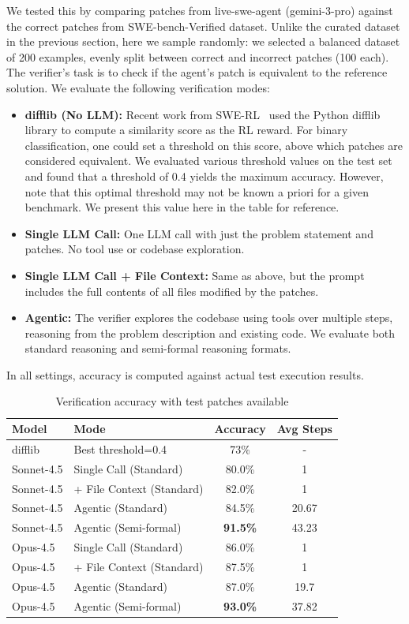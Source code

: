 \documentclass[]{meta}
\begin{document}
We tested this by comparing patches from live-swe-agent (gemini-3-pro) against the correct patches from SWE-bench-Verified dataset. Unlike the curated dataset in the previous section, here we sample randomly: we selected a balanced dataset of 200 examples, evenly split between correct and incorrect patches (100 each). The verifier's task is to check if the agent's patch is equivalent to the reference solution. We evaluate the following verification modes:
\begin{itemize}
    \item \textbf{difflib (No LLM):} Recent work from SWE-RL~\cite{wei2025swerl} used the Python difflib library to compute a similarity score as the RL reward. For binary classification, one could set a threshold on this score, above which patches are considered equivalent. We evaluated various threshold values on the test set and found that a threshold of 0.4 yields the maximum accuracy. However, note that this optimal threshold may not be known a priori for a given benchmark. We present this value here in the table for reference.

    \item \textbf{Single LLM Call:} One LLM call with just the problem statement and patches. No tool use or codebase exploration.

    \item \textbf{Single LLM Call + File Context:} Same as above, but the prompt includes the full contents of all files modified by the patches.

    \item \textbf{Agentic:} The verifier explores the codebase using tools over multiple steps, reasoning from the problem description and existing code. We evaluate both standard reasoning and semi-formal reasoning formats.
\end{itemize}
In all settings, accuracy is computed against actual test execution results.
\begin{table}[h]
\centering
\caption{Verification accuracy with test patches available}
\label{tab:verifier-full}
\begin{tabular}{llcc}
\toprule
\textbf{Model} & \textbf{Mode} & \textbf{Accuracy} & \textbf{Avg Steps} \\
\midrule
difflib & Best threshold=0.4 & 73\% & - \\
\midrule
Sonnet-4.5 & Single Call (Standard) & 80.0\% & 1 \\
Sonnet-4.5 & + File Context (Standard) & 82.0\% & 1 \\
Sonnet-4.5 & Agentic (Standard) & 84.5\% & 20.67 \\
Sonnet-4.5 & Agentic (Semi-formal) & \textbf{91.5\%} & 43.23 \\
\midrule
Opus-4.5 & Single Call (Standard) & 86.0\% & 1 \\
Opus-4.5 & + File Context (Standard) & 87.5\% & 1 \\
Opus-4.5 & Agentic (Standard) & 87.0\% & 19.7 \\
Opus-4.5 & Agentic (Semi-formal) & \textbf{93.0\%} & 37.82 \\
\bottomrule
\end{tabular}
\end{table}
\end{document}
